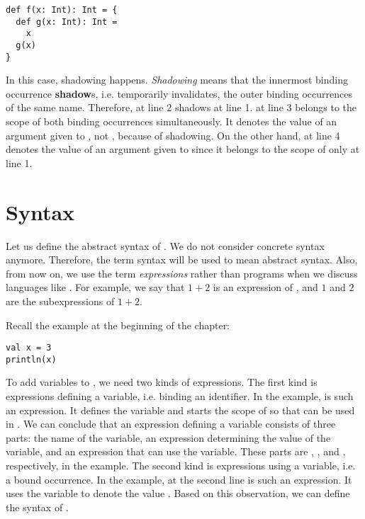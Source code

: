 \begin{verbatim}
def f(x: Int): Int = {
  def g(x: Int): Int =
    x
  g(x)
}
\end{verbatim}

In this case, shadowing happens. \textit{Shadowing} means that
the innermost binding occurrence \textbf{shadow}s, i.e. temporarily invalidates,
the outer binding occurrences of the same name. Therefore,  at line 2
shadows  at line 1.
 at line 3 belongs to the scope of both binding occurrences simultaneously.
It denotes the value of an argument given to , not , because of
shadowing. On the other hand,  at line 4 denotes the value of an
argument given to  since it belongs to the scope of only  at
line 1.

\section{Syntax}

Let us define the abstract syntax of \Lang. We do not consider concrete
syntax anymore. Therefore, the term syntax will be used to mean abstract
syntax. Also, from now on, we use the term
\textit{expressions} rather than
programs when we discuss languages like \Lang. For example, we say that
$1+2$ is an expression of \plang, and $1$ and $2$ are the subexpressions of
$1+2$.

Recall the example at the beginning of the chapter:

\begin{verbatim}
val x = 3
println(x)
\end{verbatim}

To add variables to \plang, we need two kinds of expressions. The first kind is
expressions defining a variable, i.e. binding an identifier. In the example,
 is such an expression. It defines the
variable  and starts the scope of  so that  can be used
in . We can conclude that an expression defining a variable
consists of three parts: the name of the variable, an expression determining the
value of the variable, and an expression that can use the variable. These parts
are , , and , respectively, in the example. The
second kind is expressions using a variable, i.e. a bound occurrence. In the
example,  at the second line is such an expression. It uses the variable  to denote
the value . Based on this observation, we can define the syntax of
\Lang.

